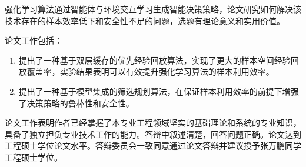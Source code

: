 
\begin{resolution}

强化学习算法通过智能体与环境交互学习生成智能决策策略，论文研究如何解决该技术存在的样本效率低下和安全性不足的问题，选题有理论意义和实用价值。 

论文工作包括：
\begin{enumerate}
    \item 提出了一种基于双层缓存的优先经验回放算法，实现了更大的样本空间经验回放覆盖率，实验结果表明可以有效提升强化学习算法的样本利用效率。
    \item 提出了一种基于模型集成的筛选规划算法，在保证样本利用效率的前提下增强了决策策略的鲁棒性和安全性。
\end{enumerate}


论文工作表明作者已经掌握了本专业工程领域坚实的基础理论和系统的专业知识，具备了独立担负专业技术工作的能力。答辩中叙述清楚，回答问题正确。论文达到工程硕士学位论文水平。答辩委员会一致同意通过论文答辩并建议授予张万鹏同学工程硕士学位。

\end{resolution}
